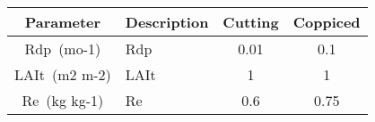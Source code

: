 \begin{tabularx}{\linewidth}{|cXcc|}
  \hline
  Parameter & Description & Cutting & Coppiced\\
\hline
\acs{Rdp}~(mo-1) & \acf{Rdp} & 0.01 & 0.1\\
\ac{LAIt}~(m2 m-2) & \acf{LAIt} & 1 & 1\\
\acs{Re}~(kg kg-1) & \acf{Re} & 0.6 & 0.75\\
\hline
\end{tabularx}

